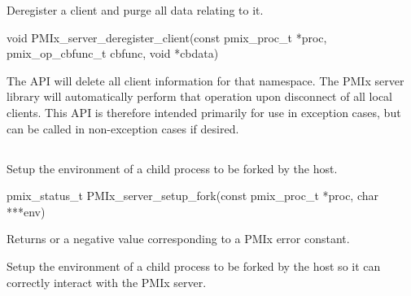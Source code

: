 \summary

Deregister a client and purge all data relating to it.

\format

\cspecificstart
\begin{codepar}
void
PMIx_server_deregister_client(const pmix_proc_t *proc,
                        pmix_op_cbfunc_t cbfunc, void *cbdata)
\end{codepar}
\cspecificend

\begin{arglist}
\end{arglist}


\descr

The  \ac{API} will delete all client information for that namespace. The \ac{PMIx} server library will automatically perform that operation upon disconnect of all local clients.
This \ac{API} is therefore intended primarily for use in exception cases, but can be called in non-exception cases if desired.


\subsection{}

\summary

Setup the environment of a child process to be forked by the host.

\format

\cspecificstart
\begin{codepar}
pmix_status_t
PMIx_server_setup_fork(const pmix_proc_t *proc,
                        char ***env)
\end{codepar}
\cspecificend

\begin{arglist}
\end{arglist}

Returns  or a negative value corresponding to a PMIx error constant.

\descr

Setup the environment of a child process to be forked by the host so it can correctly interact with the PMIx server.

